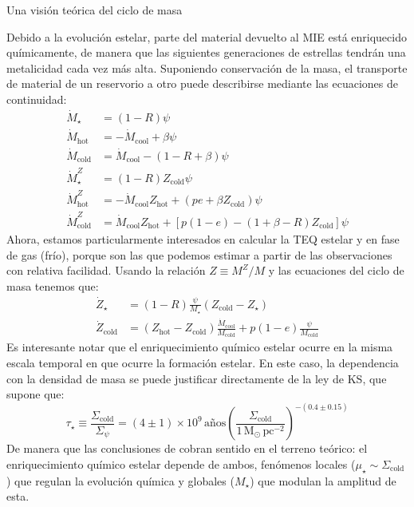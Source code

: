 \documentclass[xcolor=dvipsnames,4pt,hyperref={colorlinks,citecolor=black,linkcolor=black,urlcolor=black}]{beamer}
\begin{document}
\begin{frame}[allowframebreaks]{Una visión teórica del ciclo de masa}
\begin{description}
Debido a la evolución estelar, parte del material devuelto al MIE está enriquecido químicamente, de
manera que las siguientes generaciones de estrellas tendrán una metalicidad cada vez más alta.
Suponiendo conservación de la masa, el transporte de material de un reservorio a otro puede
describirse mediante las ecuaciones de continuidad:
%
\begin{subequations}
\begin{align}
\dot{M}_\star         &= (1-R)\psi \\
\dot{M}_\text{hot}    &= -\dot{M}_\text{cool} + \beta\psi \\
\dot{M}_\text{cold}   &= \dot{M}_\text{cool} - (1-R+\beta)\psi \\
\dot{M}_\star^Z       &= (1-R)Z_\text{cold}\psi \\
\dot{M}_\text{hot}^Z  &= -\dot{M}_\text{cool}Z_\text{hot} + (pe+\beta Z_\text{cold})\psi \\
\dot{M}_\text{cold}^Z &= \dot{M}_\text{cool}Z_\text{hot} + [p(1-e)-(1+\beta-R)Z_\text{cold}]\psi
\end{align}
\end{subequations}
%
Ahora, estamos particularmente interesados en calcular la TEQ estelar y en fase de gas (frío),
porque son las que podemos estimar a partir de las observaciones con relativa facilidad. Usando la
relación $Z\equiv M^Z/M$ y las ecuaciones del ciclo de masa tenemos que:
%
\begin{subequations}
\begin{align}
\dot{Z}_\star       &= (1-R)\frac{\psi}{M_\star}(Z_\text{cold}-Z_\star) \\
\dot{Z}_\text{cold} &= (Z_\text{hot}-Z_\text{cold})\frac{\dot{M}_\text{cool}}{M_\text{cold}} + p(1-e)\frac{\psi}{M_\text{cold}}
\end{align}
\end{subequations}
%
Es interesante notar que el enriquecimiento químico estelar ocurre en la misma escala temporal en
que ocurre la formación estelar. En este caso, la dependencia con la densidad de masa se puede
justificar directamente de la ley de KS, que supone que:
%
\begin{equation}
\tau_\star \equiv \frac{\Sigma_\text{cold}}{\Sigma_\psi} = (4\pm1)\times10^9\,\text{años}\left(\frac{\Sigma_\text{cold}}{1\,\text{M}_\odot\,\text{pc}^{-2}}\right)^{-(0.4\pm0.15)}
\end{equation}
%
De manera que las conclusiones de \citet{Gonzalez2014b} cobran sentido en el terreno teórico: el
enriquecimiento químico estelar depende de ambos, fenómenos locales
($\mu_\star\sim\Sigma_\text{cold}$) que regulan la evolución química y globales ($M_\star$) que
modulan la amplitud de esta.


\end{description}
\end{frame}
\end{document}
